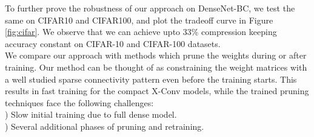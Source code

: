 \noindent To further prove the robustness of our approach on DenseNet-BC, we test the same on CIFAR10 and CIFAR100, and plot the tradeoff curve in Figure \ref{fig:cifar}.
We observe that we can achieve upto 33\% compression keeping accuracy constant on CIFAR-10 and CIFAR-100 datasets. \\

\noindent We compare our approach with methods which prune the weights during or after training. Our method can be thought of as constraining the weight matrices with a well studied sparse connectivity pattern even before the training starts. This results in fast training for the compact X-Conv models, while the trained pruning techniques face the following challenges: \\

) Slow initial training due to full dense model.\\
) Several additional phases of pruning and retraining.\\

